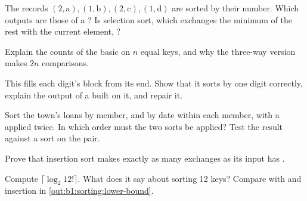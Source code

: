 \begin{exercise}[$\star$]\label{exo:b1:sorting:4}
The records $(2, \mathrm{a}), (1, \mathrm{b}), (2, \mathrm{c}), (1, \mathrm{d})$ are sorted by their number. Which
outputs are those of a ? Is selection sort, which exchanges the minimum of the rest with the current element,
?
\end{exercise}

\begin{exercise}[$\star\star$]\label{exo:b1:sorting:5}
Explain the counts of the basic  on $n$ equal keys, and why the three-way version makes $2n$ comparisons.
\end{exercise}

\begin{exercise}[$\star\star$]\label{exo:b1:sorting:6}
This  fills each digit's block from its end. Show that it sorts by one digit correctly, explain the output
of a  built on it, and repair it.
\end{exercise}

\begin{exercise}[$\star\star$]\label{exo:b1:sorting:7}
Sort the town's loans by member, and by date within each member, with a  applied twice. In which order must
the two sorts be applied? Test the result against a sort on the pair.
\end{exercise}

\begin{exercise}[$\star\star$]\label{exo:b1:sorting:8}
Prove that insertion sort makes exactly as many exchanges as its input has .
\end{exercise}

\begin{exercise}[$\star\star$]\label{exo:b1:sorting:9}
Compute $\lceil \log_2 12! \rceil$. What does it say about sorting 12 keys? Compare with  and  insertion
in \cref{out:b1:sorting:lower-bound}.
\end{exercise}

